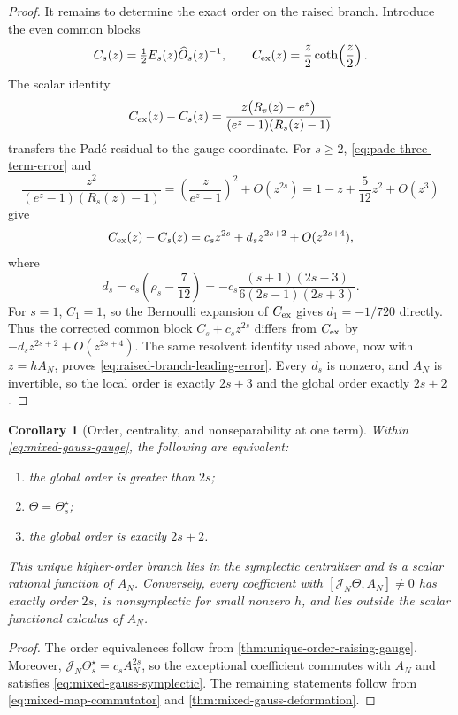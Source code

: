 \documentclass[11pt,a4paper]{article}
\newtheorem{corollary}[theorem]{Corollary}
\begin{document}
\begin{proof}
It remains to determine the exact order on the raised branch.  Introduce
the even common blocks
\[
 C_s(z)=\tfrac12E_s(z)\widehat O_s(z)^{-1},\qquad
 C_{\rm ex}(z)=\frac z2\coth\!\left(\frac z2\right).
\]
The scalar identity
\begin{equation}\label{eq:cayley-common-block-difference}
 C_{\rm ex}(z)-C_s(z)
 =\frac{z\bigl(R_s(z)-e^z\bigr)}
 {(e^z-1)(R_s(z)-1)}
\end{equation}
transfers the Pad\'e residual to the gauge coordinate.  For \(s\ge2\),
\cref{eq:pade-three-term-error} and
\[
 \frac{z^2}{(e^z-1)(R_s(z)-1)}
 =\left(\frac z{e^z-1}\right)^2+O(z^{2s})
 =1-z+\frac5{12}z^2+O(z^3)
\]
give
\begin{equation}\label{eq:two-cayley-coefficients}
 C_{\rm ex}(z)-C_s(z)
 =c_sz^{2s}+d_sz^{2s+2}+O(z^{2s+4}),
\end{equation}
where
\[
 d_s=c_s\left(\rho_s-\frac7{12}\right)
 =-c_s\frac{(s+1)(2s-3)}{6(2s-1)(2s+3)}.
\]
For \(s=1\), \(C_1=1\), so the Bernoulli expansion of
\(C_{\rm ex}\) gives \(d_1=-1/720\) directly.  Thus the corrected common
block \(C_s+c_sz^{2s}\) differs from \(C_{\rm ex}\) by
\(-d_sz^{2s+2}+O(z^{2s+4})\).  The same resolvent identity used above,
now with \(z=hA_N\), proves
\cref{eq:raised-branch-leading-error}.  Every \(d_s\) is nonzero, and
\(A_N\) is invertible, so the local order is exactly \(2s+3\) and the
global order exactly \(2s+2\).
\end{proof}

\begin{corollary}[Order, centrality, and nonseparability at one term]
\label{cor:one-term-order-centrality}
Within \cref{eq:mixed-gauss-gauge}, the following are equivalent:
\begin{enumerate}
 \item the global order is greater than \(2s\);
 \item \(\Theta=\Theta_s^\star\);
 \item the global order is exactly \(2s+2\).
\end{enumerate}
This unique higher-order branch lies in the symplectic centralizer and is
a scalar rational function of \(A_N\).  Conversely, every coefficient
with \([\mathcal J_N\Theta,A_N]\ne0\) has exactly order \(2s\), is
nonsymplectic for small nonzero \(h\), and lies outside the scalar
functional calculus of \(A_N\).
\end{corollary}

\begin{proof}
The order equivalences follow from
\cref{thm:unique-order-raising-gauge}.  Moreover,
\(\mathcal J_N\Theta_s^\star=c_sA_N^{2s}\), so the exceptional
coefficient commutes with \(A_N\) and satisfies
\cref{eq:mixed-gauss-symplectic}.  The remaining statements follow from
\cref{eq:mixed-map-commutator} and
\cref{thm:mixed-gauss-deformation}.
\end{proof}
\end{document}

